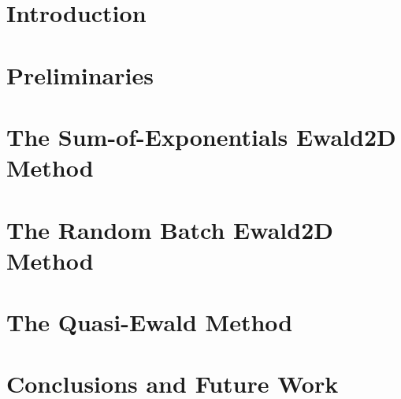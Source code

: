 \documentclass[a4paper]{ustthesis}
\begin{document}


\chapter{Introduction}
\label{chp_intro}

\newpage

\chapter{Preliminaries}
\label{chp_preliminaries}

\newpage

\chapter{The Sum-of-Exponentials Ewald2D Method}
\label{chp_soewald2d}

\newpage

\chapter{The Random Batch Ewald2D Method}
\label{chp_rbe2d}

\newpage

\chapter{The Quasi-Ewald Method}
\label{chp_quasiewald}

\newpage

\chapter{Conclusions and Future Work}
\label{chp_conclusion}

\newpage
\end{document}
